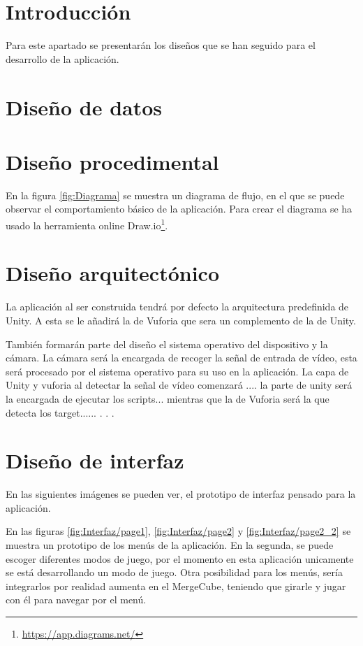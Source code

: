 
\section{Introducción}
 Para este apartado se presentarán los diseños que se han seguido para el desarrollo de la aplicación.
 
\section{Diseño de datos}

\section{Diseño procedimental}
En la figura  \ref{fig:Diagrama} se muestra un diagrama de flujo, en el que se puede observar el comportamiento básico de la aplicación. Para crear el diagrama se ha usado la herramienta online Draw.io\footnote{\url{https://app.diagrams.net/}}.

\section{Diseño arquitectónico}
La aplicación al ser construida tendrá por defecto la arquitectura predefinida de Unity. A esta se le añadirá la de Vuforia que sera un complemento de la de Unity.

También formarán parte del diseño el sistema operativo del dispositivo y la cámara. La cámara será la encargada de recoger la señal de entrada de vídeo, esta será procesado por el sistema operativo para su uso en la aplicación. La capa de Unity y vuforia al detectar la señal de vídeo comenzará .... la parte de unity será la encargada de ejecutar los scripts... mientras que la de Vuforia será la que detecta los target......
.
.
.


\section{Diseño de interfaz}

En las siguientes imágenes se pueden ver, el prototipo de interfaz pensado para la aplicación. 

En las figuras \ref{fig:Interfaz/page1}, \ref{fig:Interfaz/page2} y \ref{fig:Interfaz/page2_2} se muestra un prototipo de los menús de la aplicación. En la segunda, se puede escoger diferentes modos de juego, por el momento en esta aplicación unicamente se está desarrollando un modo de juego. 
Otra posibilidad para los menús, sería integrarlos por realidad aumenta en el MergeCube, teniendo que girarle y jugar con él para navegar por el menú.

